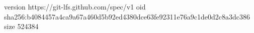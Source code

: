 version https://git-lfs.github.com/spec/v1
oid sha256:b4084457a4ca9a67a460d5b92ed4380dce63fe92311e76a9c1de0d2c8a3dc386
size 524384
